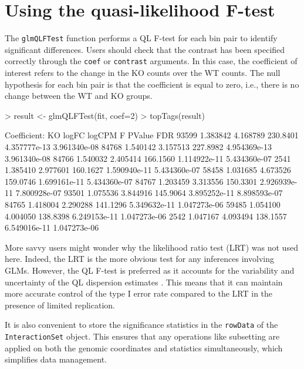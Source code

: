 \documentclass[12pt]{report}
\renewenvironment{Schunk}{\vspace{0pt}}{\vspace{0pt}}
\newcommand{\code}[1]{{\small\texttt{#1}}}
\begin{document}
\section{Using the quasi-likelihood F-test}
The \code{glmQLFTest} function performs a QL F-test for each bin pair to identify significant differences.
Users should check that the contrast has been specified correctly through the \code{coef} or \code{contrast} arguments.
In this case, the coefficient of interest refers to the change in the KO counts over the WT counts.
The null hypothesis for each bin pair is that the coefficient is equal to zero, i.e., there is no change between the WT and KO groups.

\begin{Schunk}
\begin{Sinput}
> result <- glmQLFTest(fit, coef=2)
> topTags(result)
\end{Sinput}
\begin{Soutput}
Coefficient:  KO 
         logFC   logCPM        F       PValue          FDR
93599 1.383842 4.168789 230.8401 4.357777e-13 3.961340e-08
84768 1.540142 3.157513 227.8982 4.954369e-13 3.961340e-08
84766 1.540032 2.405414 166.1560 1.114922e-11 5.434360e-07
2541  1.385410 2.977601 160.1627 1.590940e-11 5.434360e-07
58458 1.031685 4.673526 159.0746 1.699161e-11 5.434360e-07
84767 1.203459 3.313556 150.3301 2.926939e-11 7.800928e-07
93501 1.075536 3.844916 145.9064 3.895252e-11 8.898593e-07
84765 1.418004 2.290288 141.1296 5.349632e-11 1.047273e-06
59485 1.054100 4.004050 138.8398 6.249153e-11 1.047273e-06
2542  1.047167 4.093494 138.1557 6.549016e-11 1.047273e-06
\end{Soutput}
\end{Schunk}

More savvy users might wonder why the likelihood ratio test (LRT) was not used here.
Indeed, the LRT is the more obvious test for any inferences involving GLMs. 
However, the QL F-test is preferred as it accounts for the variability and uncertainty of the QL dispersion estimates \citep{lund2012ql}. 
This means that it can maintain more accurate control of the type I error rate compared to the LRT in the presence of limited replication.

It is also convenient to store the significance statistics in the \code{rowData} of the \code{InteractionSet} object.
This ensures that any operations like subsetting are applied on both the genomic coordinates and statistics simultaneously, which simplifies data management.

\begin{Schunk}
\end{Schunk}
\end{document}
